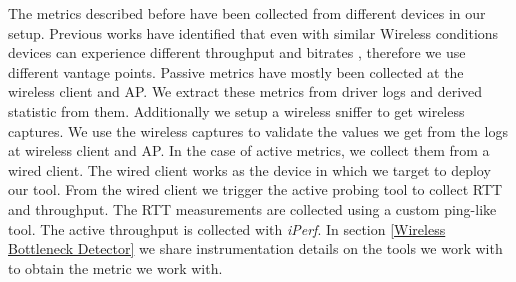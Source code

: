 The metrics described before have been collected from different devices in our setup. Previous works have identified that even with similar Wireless conditions devices can experience different throughput and bitrates \cite{measuring_user_traffic}, therefore we use different vantage points. Passive metrics have mostly been collected at the wireless client and AP. We extract these metrics from driver logs and derived statistic from them. Additionally we setup a wireless sniffer to get wireless captures. We use the wireless captures to validate the values we get from the logs at wireless client and AP. In the case of active metrics, we collect them from a wired client. The wired client works as the device in which we target to deploy our tool. From the wired client we trigger the active probing tool to collect RTT and throughput. The RTT measurements are collected using a custom ping-like tool. The active throughput is collected with \emph{iPerf}. In section \ref{Wireless Bottleneck Detector} we share instrumentation details on the tools we work with to obtain the metric we work with.
